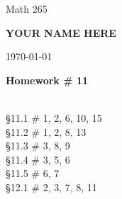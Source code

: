 \documentclass[11pt]{report}
\theoremstyle{plain}
\begin{document}
\hfill Math 265

\hfill \textbf{YOUR NAME HERE}

\hfill \today

\begin{center}
\Large{\textbf{Homework \# 11}} \\

\end{center}

\noindent{} \\ \S 11.1 \# 1, 2, 6, 10, 15\\
\S 11.2 \# 1, 2, 8, 13\\
\S 11.3 \# 3, 8, 9\\
\S 11.4 \# 3, 5, 6\\
\S 11.5 \# 6, 7\\
\S 12.1 \# 2, 3, 7, 8, 11
\end{document}
